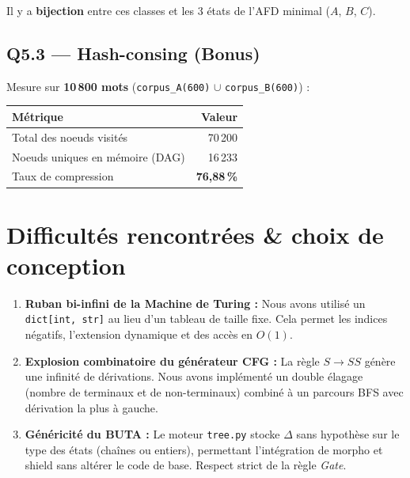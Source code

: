 \documentclass[12pt,a4paper,oneside]{scrartcl}
\begin{document}
Il y a \textbf{bijection} entre ces classes et les 3 états de l'AFD minimal ($A$, $B$, $C$).

\subsection{Q5.3 — Hash-consing (Bonus)}

Mesure sur \textbf{10\,800 mots} (\texttt{corpus\_A(600)} $\cup$ \texttt{corpus\_B(600)}) :

\begin{center}
\begin{tabular}{lr}
    \toprule
    \textbf{Métrique} & \textbf{Valeur} \\
    \midrule
    Total des noeuds visités & 70\,200 \\
    Noeuds uniques en mémoire (DAG) & 16\,233 \\
    Taux de compression & \textbf{76,88\,\%} \\
    \bottomrule
\end{tabular}
\end{center}

\newpage

\section{Difficultés rencontrées \& choix de conception}

\begin{enumerate}
    \item \textbf{Ruban bi-infini de la Machine de Turing :} Nous avons utilisé un \texttt{dict[int, str]} au lieu d'un tableau de taille fixe. Cela permet les indices négatifs, l'extension dynamique et des accès en $O(1)$.
    \item \textbf{Explosion combinatoire du générateur CFG :} La règle $S \to SS$ génère une infinité de dérivations. Nous avons implémenté un double élagage (nombre de terminaux et de non-terminaux) combiné à un parcours BFS avec dérivation la plus à gauche.
    \item \textbf{Généricité du BUTA :} Le moteur \texttt{tree.py} stocke $\Delta$ sans hypothèse sur le type des états (chaînes ou entiers), permettant l'intégration de morpho et shield sans altérer le code de base. Respect strict de la règle \textit{Gate}.
\end{enumerate}
\end{document}
